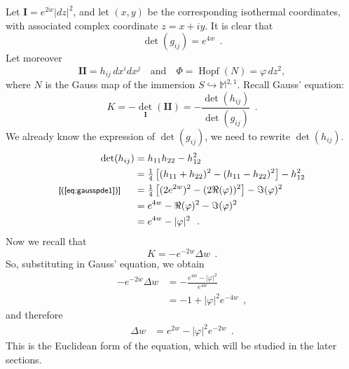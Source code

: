 \documentclass[a4paper,11pt,openright,twoside]{book}
\newcommand{\M}{\mathbb{M}^{2,1}}
\newcommand{\I}{\mathbf{I}}
\newcommand{\II}{\mathbf{I\!I}}
\newcommand{\Hopf}{\operatorname{Hopf}}
\newcommand{\1}{\mathds{1}}
\newcommand{\commb}[1]{\textsf{{\footnotesize[#1]}}}
\newcommand{\qref}[1]{(\ref{#1})}
\theoremstyle{plain}
\theoremstyle{definition}
\theoremstyle{remark}
\begin{document}
Let $\I=e^{2w}|dz|^2$, and let $(x,y)$ be the corresponding isothermal coordinates, with associated complex coordinate $z=x+iy$. It is clear that
\[
\det(g_{ij})=e^{4w}
\ \ .
\]
Let moreover
\[
\II=h_{ij}\,dx^i dx^j
\quad\text{and}\quad
\Phi=\Hopf(N)=\varphi\,dz^2,
\]
where $N$ is the Gauss map of the immersion $S\hookrightarrow \M$.
Recall Gauss' equation:
\[
K=-\det_\I(\II)=-\frac{\det(h_{ij})}{\det(g_{ij})}
\ \ .
\]
We already know the expression of $\det (g_{ij}) $, we need to rewrite $\det(h_{ij})$.
\begin{align*}
	\det(h_{ij})
	&= h_{11}h_{22}-h_{12}^2\\
	&= \tfrac{1}{4}\left[(h_{11}+h_{22})^2-(h_{11}-h_{22})^2\right]-h_{12}^2\\
	\commb{\qref{eq:gausspde1}}\hspace{5mm}
	&= \tfrac{1}{4}\left[(2e^{2w})^2-(2\Re(\varphi))^2\right]-\Im(\varphi)^2\\
	&= e^{4w}-\Re(\varphi)^2-\Im(\varphi)^2\\
	&= e^{4w}-|\varphi|^2
\ \ .
\end{align*}
Now we recall that
\[
K = -e^{-2w}\Delta w
\ \ .
\]
So, substituting in Gauss' equation, we obtain
\begin{align*}
	-e^{-2w}\Delta w
	&=
	-\frac{e^{4w}-|\varphi|^2}{e^{4w}}\\
	&=
	-1+|\varphi|^2e^{-4w}
\ \ ,
\end{align*}
and therefore
\begin{align}\label{eq:gausspde2}
	\Delta w
	&=
	e^{2w}-|\varphi|^2e^{-2w}
\ \ .
\end{align}
This is the Euclidean form of the equation, which will be studied in the later sections.\\
\end{document}
